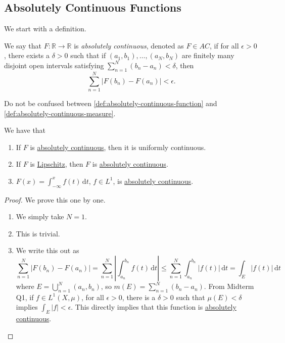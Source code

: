 
\subsection{Absolutely Continuous Functions}
We start with a definition.
\begin{definition}\label{def:absolutely-continuous-function}
	We say that \(F \colon \mathbb{R} \to \mathbb{R}\) is \emph{absolutely continuous}, denoted as \(F \in AC\), if for all \(\epsilon > 0\), there exists a
	\(\delta > 0\) such that if \((a_1,b_1),\ldots,(a_N,b_N)\) are finitely many disjoint open intervals satisfying \(\sum_{n=1}^N (b_n-a_n) < \delta\), then
	\[
		\sum_{n=1}^N \left\vert F(b_n) - F(a_n) \right\vert < \epsilon.
	\]
\end{definition}
\begin{note}
	Do not be confused between \autoref{def:absolutely-continuous-function} and \autoref{def:absolutely-continuous-measure}.
\end{note}
\begin{lemma}
	We have that
	\begin{enumerate}[(1)]
		\item If \(F\) is \hyperref[def:absolutely-continuous-function]{absolutely continuous}, then it is uniformly continuous.
		\item If \(F\) is \hyperref[def:Lipschitz]{Lipschitz}, then \(F\) is \hyperref[def:absolutely-continuous-function]{absolutely continuous}.
		\item \(F(x) = \int_{-\infty}^x f(t) \,\mathrm{d}t\), \(f \in L^1\), is \hyperref[def:absolutely-continuous-function]{absolutely continuous}.
	\end{enumerate}
\end{lemma}
\begin{proof}
	We prove this one by one.
	\begin{enumerate}[(1)]
		\item We simply take \(N = 1\).
		\item This is trivial.
		\item We write this out as
		      \[
			      \sum_{n=1}^N \left\vert F(b_n) - F(a_n) \right\vert = \sum_{n=1}^N \left\vert \int_{a_n}^{b_n} f(t) \,\mathrm{d}t \right\vert
			      \leq \sum_{n=1}^N \int_{a_n}^{b_n} \left\vert f(t) \right\vert \,\mathrm{d}t
			      = \int_E \left\vert f(t) \right\vert \,\mathrm{d}t
		      \]
		      where \(E = \bigcup_{n=1}^N (a_n,b_n)\), so \(m(E) = \sum_{n=1}^N (b_n-a_n)\). From Midterm Q1, if \(f \in L^1(X,\mu)\), for all \(\epsilon > 0\),
		      there is a \(\delta > 0\) such that \(\mu(E) < \delta\) implies \(\int_E \left\vert f \right\vert < \epsilon\).
		      This directly implies that this function is \hyperref[def:absolutely-continuous-function]{absolutely continuous}.
	\end{enumerate}
\end{proof}

